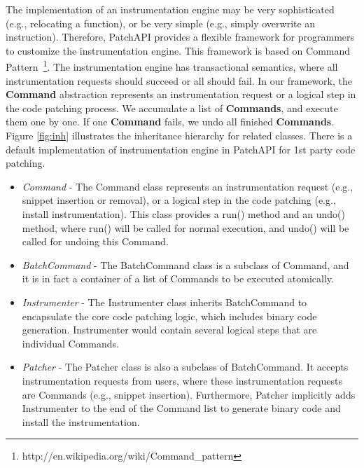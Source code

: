 The implementation of an instrumentation engine may be very sophisticated (e.g.,
relocating a function), or be very simple (e.g., simply overwrite an
instruction). Therefore, PatchAPI provides a flexible framework for programmers
to customize the instrumentation engine. This framework is based on Command
Pattern~\footnote{http://en.wikipedia.org/wiki/Command\_pattern}. The
instrumentation engine has transactional semantics, where all instrumentation
requests should succeed or all should fail. In our framework, the
\textbf{Command} abstraction represents an instrumentation request or a logical
step in the code patching process. We accumulate a list of \textbf{Commands},
and execute them one by one. If one \textbf{Command} fails, we undo all finished
\textbf{Commands}. Figure \ref{fig:inh} illustrates the inheritance hierarchy
for related classes. There is a default implementation of instrumentation engine
in PatchAPI for 1st party code patching.
\begin{itemize}
\item \emph{Command} - The Command class represents an instrumentation request (e.g.,
    snippet insertion or removal), or a logical step in the code patching (e.g.,
    install instrumentation). This class provides a run() method and an undo()
    method, where run() will be called for normal execution, and undo() will be
    called for undoing this Command.
\item \emph{BatchCommand} - The BatchCommand class is a subclass of Command, and it is
    in fact a container of a list of Commands to be executed atomically.
\item \emph{Instrumenter} - The Instrumenter class inherits BatchCommand to encapsulate
    the core code patching logic, which includes binary code generation.
    Instrumenter would contain several logical steps that are individual
    Commands.
\item \emph{Patcher} - The Patcher class is also a subclass of BatchCommand. It accepts
    instrumentation requests from users, where these instrumentation requests
    are Commands (e.g., snippet insertion). Furthermore, Patcher implicitly adds
    Instrumenter to the end of the Command list to generate binary code and
    install the instrumentation.
\end{itemize}
